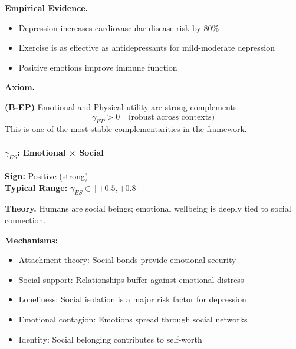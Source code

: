 \textbf{Empirical Evidence.}
\begin{itemize}
    \item Depression increases cardiovascular disease risk by 80\% \citep{nicholson2006depression}
    \item Exercise is as effective as antidepressants for mild-moderate depression \citep{blumenthal2007exercise}
    \item Positive emotions improve immune function \citep{cohen2003emotional}
\end{itemize}

\textbf{Axiom.}
\begin{axiom}
\label{ax:B-EP}
\textbf{(B-EP)} Emotional and Physical utility are strong complements:
\begin{equation}
    \gamma_{EP} > 0 \quad \text{(robust across contexts)}
\end{equation}
This is one of the most stable complementarities in the framework.
\end{axiom}


\paragraph{$\gamma_{ES}$: Emotional × Social}

\begin{tcolorbox}[colback=green!5, colframe=green!50!black]
\textbf{Sign:} Positive (strong) \\
\textbf{Typical Range:} $\gamma_{ES} \in [+0.5, +0.8]$
\end{tcolorbox}

\textbf{Theory.}
Humans are social beings; emotional wellbeing is deeply tied to social connection.

\textbf{Mechanisms:}
\begin{itemize}
    \item Attachment theory: Social bonds provide emotional security
    \item Social support: Relationships buffer against emotional distress
    \item Loneliness: Social isolation is a major risk factor for depression
    \item Emotional contagion: Emotions spread through social networks
    \item Identity: Social belonging contributes to self-worth
\end{itemize}

